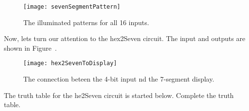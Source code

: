 \begin{enumerate}
\begin{figure}[ht]
\texttt{[image: sevenSegmentPattern]}
\caption{The illuminated patterns for all 16 inputs. }
\label{figure:dataPathControlSevenSegmentPatterns}
\end{figure}

Now, lets turn our attention to the hex2Seven circuit.  The input and 
outputs are shown in Figure~.

\begin{figure}[ht]
\texttt{[image: hex2SevenToDisplay]}
\caption{The connection beteen the 4-bit input nd the 7-segment display. }
\label{figure:he2SevenToDisplay}
\end{figure}

The truth table for the he2Seven circuit is started below.  Complete the
truth table.


\end{enumerate}
